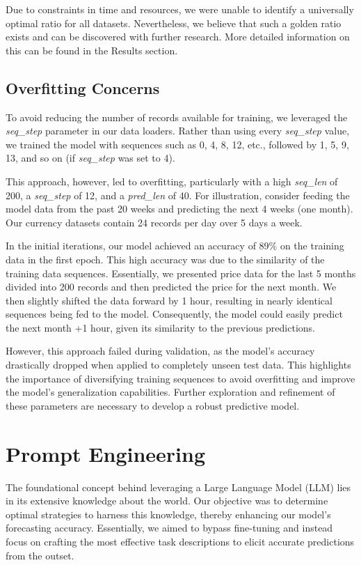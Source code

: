 Due to constraints in time and resources, we were unable to identify a universally optimal ratio for all datasets. Nevertheless, we believe that such a golden ratio exists and can be discovered with further research. More detailed information on this can be found in the Results section.

\subsection{Overfitting Concerns}
To avoid reducing the number of records available for training, we leveraged the \textit{seq\_step} parameter in our data loaders. Rather than using every \textit{seq\_step} value, we trained the model with sequences such as 0, 4, 8, 12, etc., followed by 1, 5, 9, 13, and so on (if \textit{seq\_step} was set to 4).

This approach, however, led to overfitting, particularly with a high \textit{seq\_len} of 200, a \textit{seq\_step} of 12, and a \textit{pred\_len} of 40. For illustration, consider feeding the model data from the past 20 weeks and predicting the next 4 weeks (one month). Our currency datasets contain 24 records per day over 5 days a week.

In the initial iterations, our model achieved an accuracy of 89\% on the training data in the first epoch. This high accuracy was due to the similarity of the training data sequences. Essentially, we presented price data for the last 5 months divided into 200 records and then predicted the price for the next month. We then slightly shifted the data forward by 1 hour, resulting in nearly identical sequences being fed to the model. Consequently, the model could easily predict the next month +1 hour, given its similarity to the previous predictions.

However, this approach failed during validation, as the model's accuracy drastically dropped when applied to completely unseen test data. This highlights the importance of diversifying training sequences to avoid overfitting and improve the model's generalization capabilities. Further exploration and refinement of these parameters are necessary to develop a robust predictive model.

\section{Prompt Engineering}

The foundational concept behind leveraging a Large Language Model (LLM) lies in its extensive knowledge about the world. Our objective was to determine optimal strategies to harness this knowledge, thereby enhancing our model's forecasting accuracy. Essentially, we aimed to bypass fine-tuning and instead focus on crafting the most effective task descriptions to elicit accurate predictions from the outset.

